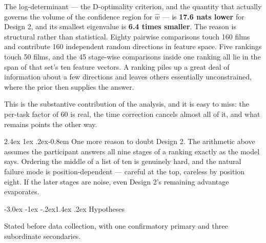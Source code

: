 \documentclass[11pt,a4paper]{article}
\makeatletter
\renewcommand\subsection{\@startsection{subsection}{2}{\z@}%
  {-3.0ex \@plus -1ex \@minus -.2ex}{1.4ex \@plus .2ex}%
  {\normalfont\large\sffamily\bfseries\color{accent}}}
\renewcommand\paragraph{\@startsection{paragraph}{4}{\z@}%
  {2.4ex \@plus1ex \@minus.2ex}{-0.8em}%
  {\normalfont\normalsize\sffamily\bfseries\color{black}}}
\makeatother
\begin{document}
The log-determinant --- the D-optimality criterion, and the quantity that
actually governs the volume of the confidence region for $\hat{w}$ --- is
\textbf{17.6 nats lower} for Design 2, and its smallest eigenvalue is
\textbf{6.4 times smaller}. The reason is structural rather than statistical.
Eighty pairwise comparisons touch 160 films and contribute 160 independent random
directions in feature space. Five rankings touch 50 films, and the 45 stage-wise
comparisons inside one ranking all lie in the span of that set's ten feature
vectors. A ranking piles up a great deal of information about a few directions
and leaves others essentially unconstrained, where the prior then supplies the
answer.

This is the substantive contribution of the analysis, and it is easy to miss: the
per-task factor of 60 is real, the time correction cancels almost all of it, and
what remains points the other way.

\paragraph{One more reason to doubt Design 2.} The arithmetic above assumes the
participant answers all nine stages of a ranking exactly as the model says.
Ordering the middle of a list of ten is genuinely hard, and the natural failure
mode is position-dependent --- careful at the top, careless by position eight. If
the later stages are noise, even Design 2's remaining advantage evaporates.

\subsection{Hypotheses}

Stated before data collection, with one confirmatory primary and three
subordinate secondaries.
\end{document}
